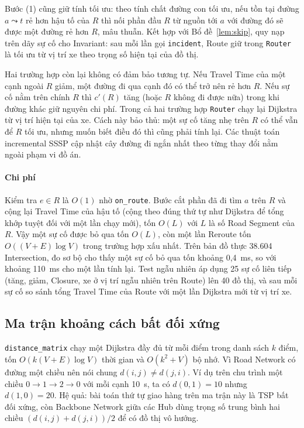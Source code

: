 Bước (1) cũng giữ tính tối ưu: theo tính chất đường con tối ưu, nếu tồn tại đường $a \leadsto t$ rẻ hơn hậu tố của $R$ thì nối phần đầu $R$ từ nguồn tới $a$ với đường đó sẽ được một đường rẻ hơn $R$, mâu thuẫn. Kết hợp với Bổ đề~\ref{lem:skip}, quy nạp trên dãy sự cố cho Invariant: sau mỗi lần gọi \texttt{incident}, Route giữ trong \texttt{Router} là tối ưu từ vị trí xe theo trọng số hiện tại của đồ thị.

Hai trường hợp còn lại không có đảm bảo tương tự. Nếu Travel Time của một cạnh ngoài $R$ giảm, một đường đi qua cạnh đó có thể trở nên rẻ hơn $R$. Nếu sự cố nằm trên chính $R$ thì $c'(R)$ tăng (hoặc $R$ không đi được nữa) trong khi đường khác giữ nguyên chi phí. Trong cả hai trường hợp \texttt{Router} chạy lại Dijkstra từ vị trí hiện tại của xe. Cách này bảo thủ: một sự cố tăng nhẹ trên $R$ có thể vẫn để $R$ tối ưu, nhưng muốn biết điều đó thì cũng phải tính lại. Các thuật toán incremental SSSP cập nhật cây đường đi ngắn nhất theo từng thay đổi nằm ngoài phạm vi đồ án.

\paragraph{Chi phí}
Kiểm tra $e \in R$ là $O(1)$ nhờ \texttt{on\_route}. Bước cắt phần đã đi tìm $a$ trên $R$ và cộng lại Travel Time của hậu tố (cộng theo đúng thứ tự như Dijkstra để tổng khớp tuyệt đối với một lần chạy mới), tốn $O(L)$ với $L$ là số Road Segment của $R$. Vậy một sự cố được bỏ qua tốn $O(L)$, còn một lần Reroute tốn $O((V+E)\log V)$ trong trường hợp xấu nhất. Trên bản đồ thực 38.604 Intersection, đo sơ bộ cho thấy một sự cố bỏ qua tốn khoảng 0,4~ms, so với khoảng 110~ms cho một lần tính lại. Test ngẫu nhiên áp dụng 25 sự cố liên tiếp (tăng, giảm, Closure, xe ở vị trí ngẫu nhiên trên Route) lên 40 đồ thị, và sau mỗi sự cố so sánh tổng Travel Time của Route với một lần Dijkstra mới từ vị trí xe.

\subsection{Ma trận khoảng cách bất đối xứng}

\texttt{distance\_matrix} chạy một Dijkstra đầy đủ từ mỗi điểm trong danh sách $k$ điểm, tốn $O(k(V+E)\log V)$ thời gian và $O(k^2+V)$ bộ nhớ. Vì Road Network có đường một chiều nên nói chung $d(i,j) \ne d(j,i)$. Ví dụ trên chu trình một chiều $0 \to 1 \to 2 \to 0$ với mỗi cạnh 10~s, ta có $d(0,1) = 10$ nhưng $d(1,0) = 20$. Hệ quả: bài toán thứ tự giao hàng trên ma trận này là TSP bất đối xứng, còn Backbone Network giữa các Hub dùng trọng số trung bình hai chiều $(d(i,j)+d(j,i))/2$ để có đồ thị vô hướng.
